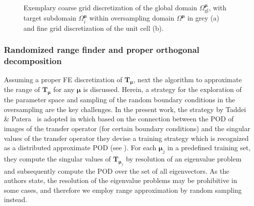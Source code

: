 \documentclass[a4paper]{eccomas_paper-2024}
\newcommand{\m}{\bm\mu}
\newcommand{\gl}{\mathrm{gl}}
\begin{document}
\begin{figure}
    \centering
    
    \caption{Exemplary coarse grid discretization of the global domain $\varOmega^{\m}_{\gl}$, with target subdomain $\varOmega^{\m}_i$ within oversampling domain $\varOmega^{\m}$ in grey (a) and fine grid discretization of the unit cell (b).}\label{fig:oversampling_domain}
\end{figure}



\subsubsection{Randomized range finder and proper orthogonal decomposition} %
\label{sec:Randomized range finder and POD}

Assuming a proper FE discretization of $\bm{T}_{\m}$, next the algorithm to approximate the range of $\bm{T}_{\m}$ for any $\m$ is discussed.
Herein, a strategy for the exploration of the parameter space and sampling of the random boundary conditions in the oversampling are the key challenges.
In the present work, the strategy by Taddei \& Patera~\cite{Taddei2018Localization} is adopted in which based on the connection between the POD of images of the transfer operator (for certain boundary conditions) and the singular values of the transfer operator they devise a training strategy which is recognized as a distributed approximate POD (see \cite{Himpe2018Hierarchical}).
For each $\m_j$ in a predefined training set, they compute the singular values of $\bm{T}_{\m_j}$ by resolution of an eigenvalue problem and subsequently compute the POD over the set of all eigenvectors.
As the authors state, the resolution of the eigenvalue problems may be prohibitive in some cases, and therefore we employ range approximation by random sampling instead.
\end{document}
